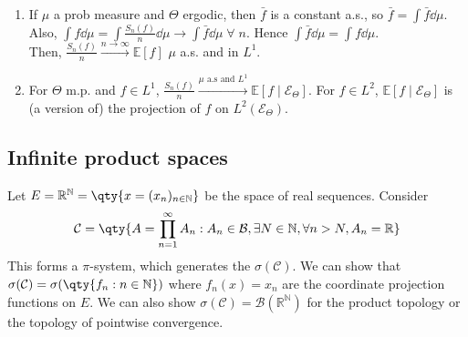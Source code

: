 \begin{remark} \label{rem:ergodic} \
	\begin{enumerate}
		\item If $\mu$ a prob measure and $\Theta$ ergodic, then $\bar f$ is a constant a.s., so $\bar f = \int \bar f \dd{\mu}$.
		Also, $\int f \dd{\mu} = \int \frac{S_n(f)}{n} \dd{\mu} \to \int \bar f \dd{\mu} \; \forall \; n$.
		Hence $\int \bar f \dd{\mu} = \int f \dd{\mu}$. \\
		Then, $\frac{S_n(f)}{n} \xrightarrow{n \to \infty} \mathbb{E}[f]$ $\mu$ a.s. and in $L^1$.
		\item For $\Theta$ m.p. and $f \in L^1$, $\frac{S_n(f)}{n} \xrightarrow{\mu \text{ a.s and } L^1} \mathbb{E}[f \mid \mathcal{E}_\Theta]$.
		For $f \in L^2$, $\mathbb{E}[f \mid \mathcal{E}_\Theta]$ is (a version of) the projection of $f$ on $L^2(\mathcal{E}_\Theta)$.
	\end{enumerate}
\end{remark}

\subsection{Infinite product spaces}
Let $E = \mathbb R^{\mathbb N} = \qty{x = (x_n)_{n \in \mathbb N}}$ be the space of real sequences.
Consider
\begin{align*}
        \mathcal C = \qty{A = \prod_{n=1}^\infty A_n : A_n \in \mathcal B, \exists N \in \mathbb N, \forall n > N, A_n = \mathbb R}
    \end{align*}
This forms a $\pi$-system, which generates the  $\sigma(\mathcal C)$.
We can show that $\sigma(\mathcal C) = \sigma(\qty{f_n : n \in \mathbb N})$ where $f_n(x) = x_n$ are the coordinate projection functions on $E$.
We can also show $\sigma(\mathcal C) = \mathcal B(\mathbb R^{\mathbb N})$ for the product topology or the topology of pointwise convergence.

